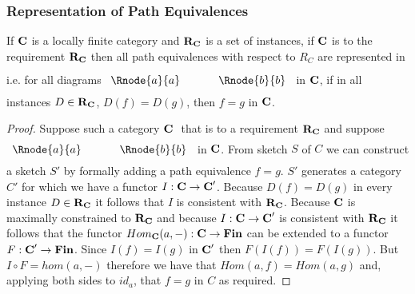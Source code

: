 \subsubsection{Representation of Path Equivalences}

\begin{lemma}
If $\textbf{C}$ is a locally finite category and $\textbf{R}_{\textbf{C}}$ is a set of instances, if $\textbf{C}$ is 
 to the requirement $\textbf{R}_{\textbf{C}}$ then all path equivalences with respect
to $R_C$ are represented in \catcw
i.e. for all diagrams
$
\rule[-0.3cm]{0pt}{0.9cm} %
\begin{array}{c p{0.5cm} c  }
 \Rnode{a}{a}            &&   \Rnode{b}{b}
\end{array} 
$
in $\textbf{C}$,  if in all instances $D \in \textbf{R}_{\textbf{C}}$, $D(f)=D(g)$, 
then $f=g$ in $\textbf{C}$.
\end{lemma}
\begin{proof}
Suppose such a category  $\textbf{C}\ $  that  is 
 to a requirement $\textbf{R}_{\textbf{C}}$
and suppose 
$
\rule[-0.3cm]{0pt}{0.8cm} %
\begin{array}{c p{0.5cm} c  }
 \Rnode{a}{a}            &&   \Rnode{b}{b}
\end{array} 
$
in $\textbf{C}$. From sketch $S$ of $C$ we can construct a sketch $S'$ by formally adding a path equivalence $f=g$.
$S'$ generates a category $C'$ for which we have a functor $I: \textbf{C} \rightarrow \textbf{C}'$. 
Because $D(f) = D(g)$ in every instance $D \in \textbf{R}_{\textbf{C}}$
it follows that $I$ is consistent with $\textbf{R}_{\textbf{C}}$. Because $\textbf{C}$ is maximally constrained to $\textbf{R}_{\textbf{C}}$
and because $I: \textbf{C} \rightarrow \textbf{C}'$ is consistent with $\textbf{R}_{\textbf{C}}$ it follows that the functor $Hom_{\textbf{C}}(a,-): \textbf{C} \rightarrow \textbf{Fin}$ 
can be extended to a functor $F: \textbf{C}' \rightarrow \textbf{Fin}$. Since $I(f)=I(g)$ in $\textbf{C}'$ then $F(I(f))=F(I(g))$. But $I \circ F
= hom(a,-)$ therefore we have that $Hom(a,f)=Hom(a,g)$ and, applying both sides to $id_a$, that $f=g$ in $C$ as required.
\end{proof}

